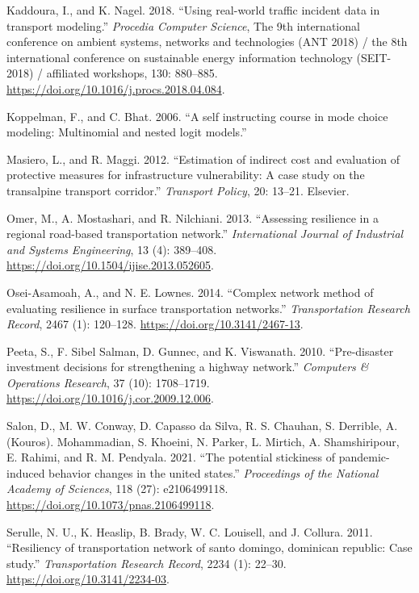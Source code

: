 \documentclass[]{ascelike-new}
\newlength{\cslhangindent}
\newenvironment{CSLReferences}[2] %
 {\begin{list}{}{%
  \setlength{\itemindent}{0pt}
  \setlength{\leftmargin}{0pt}
  \setlength{\parsep}{0pt}
  \ifodd #1
   \setlength{\leftmargin}{\cslhangindent}
   \setlength{\itemindent}{-1\cslhangindent}
  \fi
  \setlength{\itemsep}{#2\baselineskip}}}
 {\end{list}}
\begin{document}
\begin{CSLReferences}{1}{0}
Kaddoura, I., and K. Nagel. 2018. {``Using real-world traffic incident
data in transport modeling.''} \emph{Procedia Computer Science}, The 9th
international conference on ambient systems, networks and technologies
({ANT} 2018) / the 8th international conference on sustainable energy
information technology ({SEIT-2018}) / affiliated workshops, 130:
880--885. \url{https://doi.org/10.1016/j.procs.2018.04.084}.

Koppelman, F., and C. Bhat. 2006. {``A self instructing course in mode
choice modeling: Multinomial and nested logit models.''}

Masiero, L., and R. Maggi. 2012. {``Estimation of indirect cost and
evaluation of protective measures for infrastructure vulnerability: A
case study on the transalpine transport corridor.''} \emph{Transport
Policy}, 20: 13--21. Elsevier.

Omer, M., A. Mostashari, and R. Nilchiani. 2013. {``Assessing resilience
in a regional road-based transportation network.''} \emph{International
Journal of Industrial and Systems Engineering}, 13 (4): 389--408.
\url{https://doi.org/10.1504/ijise.2013.052605}.

Osei-Asamoah, A., and N. E. Lownes. 2014. {``Complex network method of
evaluating resilience in surface transportation networks.''}
\emph{Transportation Research Record}, 2467 (1): 120--128.
\url{https://doi.org/10.3141/2467-13}.

Peeta, S., F. Sibel Salman, D. Gunnec, and K. Viswanath. 2010.
{``Pre-disaster investment decisions for strengthening a highway
network.''} \emph{Computers \& Operations Research}, 37 (10):
1708--1719. \url{https://doi.org/10.1016/j.cor.2009.12.006}.

Salon, D., M. W. Conway, D. Capasso da Silva, R. S. Chauhan, S.
Derrible, A. (Kouros). Mohammadian, S. Khoeini, N. Parker, L. Mirtich,
A. Shamshiripour, E. Rahimi, and R. M. Pendyala. 2021. {``The potential
stickiness of pandemic-induced behavior changes in the united states.''}
\emph{Proceedings of the National Academy of Sciences}, 118 (27):
e2106499118. \url{https://doi.org/10.1073/pnas.2106499118}.

Serulle, N. U., K. Heaslip, B. Brady, W. C. Louisell, and J. Collura.
2011. {``Resiliency of transportation network of santo domingo,
dominican republic: Case study.''} \emph{Transportation Research
Record}, 2234 (1): 22--30. \url{https://doi.org/10.3141/2234-03}.


\end{CSLReferences}
\end{document}
